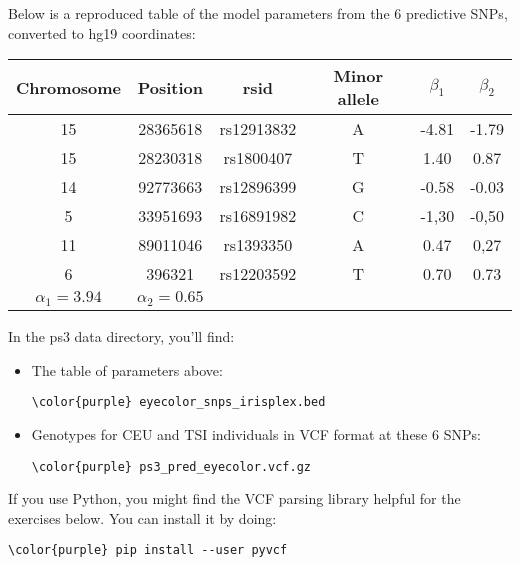 \documentclass[12pt]{article}
\begin{document}
Below is a reproduced table of the model parameters from the 6 predictive SNPs, converted to hg19 coordinates:
\begin{table}[h!]
\begin{tabular}{|c|c|c|c|c|c|}
\hline
Chromosome & Position & rsid & Minor allele & $\beta_{1}$  & $\beta_{2}$\\
\hline
15 & 28365618 & rs12913832 & A & -4.81 & -1.79 \\
15 & 28230318 & rs1800407 & T & 1.40 & 0.87 \\
14 & 92773663 & rs12896399 & G & -0.58 & -0.03 \\
5 & 33951693 & rs16891982 & C & -1,30 & -0,50 \\
11 & 89011046 & rs1393350 & A & 0.47 & 0,27 \\
6 & 396321 & rs12203592 & T & 0.70 & 0.73 \\
\hline
$\alpha_1=3.94$ & $\alpha_2=0.65$ & & && \\
\hline
\end{tabular}
\end{table}

In the ps3 data directory, you'll find:

\begin{itemize}
\item The table of parameters above:

\begin{Verbatim}[commandchars=\\\{\}]
\color{purple} eyecolor_snps_irisplex.bed
\end{Verbatim}

\item Genotypes for CEU and TSI individuals in VCF format at these 6 SNPs:
\begin{Verbatim}[commandchars=\\\{\}]
\color{purple} ps3_pred_eyecolor.vcf.gz
\end{Verbatim}
\end{itemize}

If you use Python, you might find the VCF parsing library helpful for the exercises below. You can install it by doing:
\begin{Verbatim}[commandchars=\\\{\}]
\color{purple} pip install --user pyvcf
\end{Verbatim}
\end{document}
